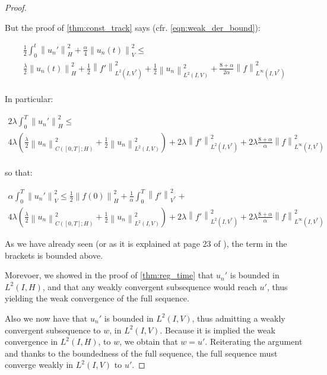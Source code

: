 \documentclass[english,a4paper,12pt,oneside]{scrbook}
\theoremstyle{break}
\newenvironment{mproof}[1][\proofname]{%
  \begin{proof}[#1]$ $\par\nobreak\ignorespaces
}{%
  \end{proof}
}
\renewcommand*{\proofname}{Proof}
\theoremstyle{remark}
\newcommand{\norm}[1]{\left\lVert#1\right\rVert}
\newcommand{\HN}[1]{\norm{#1}_{H}}
\newcommand{\VN}[1]{\norm{#1}_{V}}
\newcommand{\VSN}[1]{\norm{#1}_{V^*}}
\begin{document}
\begin{mproof}
But the proof of \cref{thm:const_track} says (cfr. \cref{eqn:weak_der_bound}):

\begin{align*}
\frac{1}{2}\int_0^t\HN{u_n'}^2+\frac{\alpha}{4}\VN{u_n(t)}^2\leq \\
\frac{\lambda}{2}\HN{u_n(t)}^2 + \frac{1}{2}\norm{f'}_{L^2(I,V^*)}^2 + \frac{1}{2}\norm{u_n}_{L^2(I,V)}^2 + \frac{8+\alpha}{2\alpha}\norm{f}_{L^\infty(I,V^*)}^2\\
\end{align*}

In particular:

\begin{align*}
2\lambda\int_0^T\HN{u_n'}^2\leq \\
4 \lambda \left (\frac{\lambda}{2} \norm{u_n}^2_{C([0,T];H)} + \frac{1}{2}\norm{u_n}_{L^2(I,V)}^2 \right )+ 2\lambda \norm{f'}_{L^2(I,V^*)}^2  + 2\lambda\frac{8+\alpha}{\alpha}\norm{f}_{L^\infty(I,V^*)}^2\\
\end{align*}

so that:

\begin{align*}
\alpha \int_0^T \VN{u_n'}^2 \leq \frac{1}{2} \HN{f(0)}^2 +\frac{1}{\alpha} \int_0^T \VSN{ f'}^2+\\
4 \lambda \left (\frac{\lambda}{2} \norm{u_n}^2_{C([0,T];H)} + \frac{1}{2}\norm{u_n}_{L^2(I,V)}^2 \right )+ 2\lambda \norm{f'}_{L^2(I,V^*)}^2  + 2\lambda\frac{8+\alpha}{\alpha}\norm{f}_{L^\infty(I,V^*)}^2
\end{align*}

As we have already seen (or as it is explained at page 23 of \cite{gilardi}), the term in the brackets is bounded above.


Morevoer, we showed in the proof of \cref{thm:reg_time} that $u_n'$ is bounded in $L^2(I,H)$, and that any weakly convergent subsequence would reach $u'$, thus yielding the weak convergence of the full sequence.


Also we now have that $u_n'$ is bounded in $L^2(I,V)$, thus admitting a weakly convergent subsequence to $w$, in $L^2(I,V)$. Because it is implied the weak convergence in $L^2(I,H)$, to $w$, we obtain that $w=u' $. Reiterating the argument and thanks to the boundedness of the full sequence, the full sequence must converge weakly in $L^2(I,V)$ to $u'$.


\end{mproof}
\end{document}
